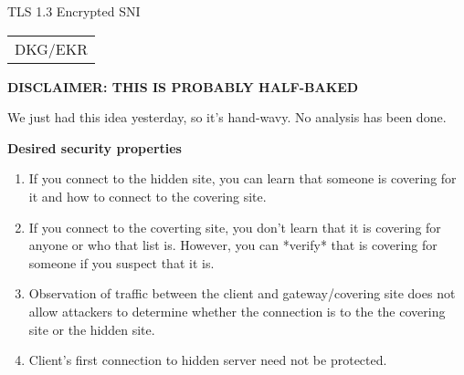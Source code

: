 \documentclass[helvetica]{seminar}
\newcommand{\heading}[1]{%
  \begin{center} 
    \large\bf 
    #1 
  \end{center} 
  \vspace{.4 in}}
\begin{document}
\begin{slide}
\begin{center}
\vspace{.5 in}
\LARGE{{\bf}TLS 1.3 Encrypted SNI}\\
\vspace{.2in}
\large{
\begin{tabular}{c}
DKG/EKR
\end{tabular}
}
\end{center}

\end{slide}

\begin{slide}
\heading{DISCLAIMER: THIS IS PROBABLY HALF-BAKED}

We just had this idea yesterday, so it's hand-wavy. No analysis has been done.
\end{slide}


\centerslidesfalse 

\begin{slide}
\heading{Desired security properties}

\begin{enumerate}
\item If you connect to the hidden site, you can learn that someone is covering
   for it and how to connect to the covering site.
\item If you connect to the coverting site, you don't learn that it is covering
   for anyone or who that list is. However, you can *verify* that is covering
   for someone if you suspect that it is.
\item Observation of traffic between the client and gateway/covering site does not allow attackers
   to determine whether the connection is to the the covering site or the
   hidden site.
\item Client's first connection to hidden server need not be protected.
\end{enumerate}

\end{slide}
\end{document}
